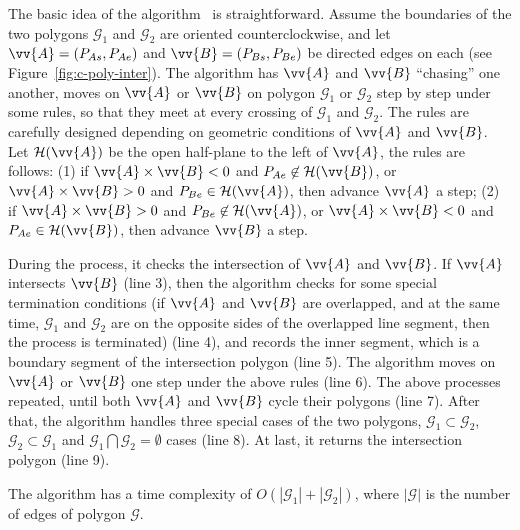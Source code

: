 The basic idea of the algorithm~\cite{ORourke:Intersection} is straightforward. Assume the boundaries of the two polygons $\mathcal{G}_1$ and $\mathcal{G}_2$ are oriented counterclockwise, and let $\vv{A} = (P_{As}, P_{Ae})$ and $\vv{B} = (P_{Bs}, P_{Be})$ be directed edges on each (see Figure~\ref{fig:c-poly-inter}).
The algorithm has $\vv{A}$ and $\vv{B}$ ``chasing'' one another, \ie moves on $\vv{A}$ or $\vv{B}$ on polygon $\mathcal{G}_1$ or $\mathcal{G}_2$ step by step under some rules, so that they meet at every crossing of $\mathcal{G}_1$ and $\mathcal{G}_2$.
%
The rules are carefully designed depending on geometric conditions of $\vv{A}$ and $\vv{B}$.
Let $\mathcal{H}(\vv{A})$ be the open half-plane to the left of $\vv{A}$, the rules are follows:
(1) if $\vv{A} \times \vv{B} < 0$ and $P_{Ae} \not \in \mathcal{H}(\vv{B})$, or $\vv{A} \times \vv{B} > 0$ and $P_{Be} \in \mathcal{H}(\vv{A})$, then advance $\vv{A}$ a step;
(2) if $\vv{A} \times \vv{B} > 0$ and $P_{Be} \not \in \mathcal{H}(\vv{A})$, or $\vv{A} \times \vv{B} < 0$ and $P_{Ae} \in \mathcal{H}(\vv{B})$, then advance $\vv{B}$ a step.



During the process, it checks the intersection of $\vv{A}$ and $\vv{B}$. If $\vv{A}$ intersects $\vv{B}$ (line 3), then the algorithm checks for some special termination conditions (\eg if $\vv{A}$ and $\vv{B}$ are overlapped, and at the same time, $\mathcal{G}_1$ and $\mathcal{G}_2$ are on the opposite sides of the overlapped line segment, then the process is terminated) (line 4), and records the inner segment, which is a boundary segment of the intersection polygon (line 5).
%
The algorithm moves on $\vv{A}$ or $\vv{B}$ one step under the above rules (line 6).
The above processes repeated, until both $\vv{A}$ and $\vv{B}$ cycle their polygons (line 7).
%
After that, the algorithm handles three special cases of the two polygons, \ie $\mathcal{G}_1 \subset \mathcal{G}_2$, $\mathcal{G}_2 \subset \mathcal{G}_1$ and $\mathcal{G}_1 \bigcap \mathcal{G}_2 = \emptyset$ cases (line 8).
%
At last, it returns the intersection polygon (line 9).

The algorithm has a time complexity of $O(|\mathcal{G}_1| + |\mathcal{G}_2|)$, where $|\mathcal{G}|$ is the number of edges of polygon $\mathcal{G}$.





